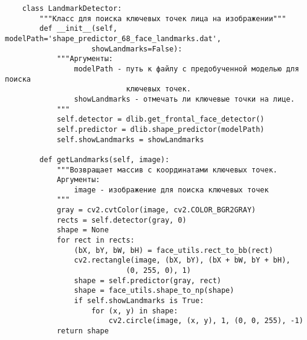 \begin{verbatim}
    class LandmarkDetector:
        """Класс для поиска ключевых точек лица на изображении"""
        def __init__(self, modelPath='shape_predictor_68_face_landmarks.dat',
                    showLandmarks=False):
            """Аргументы:
                modelPath - путь к файлу с предобученной моделью для поиска
                            ключевых точек.
                showLandmarks - отмечать ли ключевые точки на лице.
            """
            self.detector = dlib.get_frontal_face_detector()
            self.predictor = dlib.shape_predictor(modelPath)
            self.showLandmarks = showLandmarks

        def getLandmarks(self, image):
            """Возвращает массив с координатами ключевых точек.
            Аргументы:
                image - изображение для поиска ключевых точек
            """
            gray = cv2.cvtColor(image, cv2.COLOR_BGR2GRAY)
            rects = self.detector(gray, 0)
            shape = None
            for rect in rects:
                (bX, bY, bW, bH) = face_utils.rect_to_bb(rect)
                cv2.rectangle(image, (bX, bY), (bX + bW, bY + bH),
                            (0, 255, 0), 1)
                shape = self.predictor(gray, rect)
                shape = face_utils.shape_to_np(shape)
                if self.showLandmarks is True:
                    for (x, y) in shape:
                        cv2.circle(image, (x, y), 1, (0, 0, 255), -1)
            return shape



\end{verbatim}
